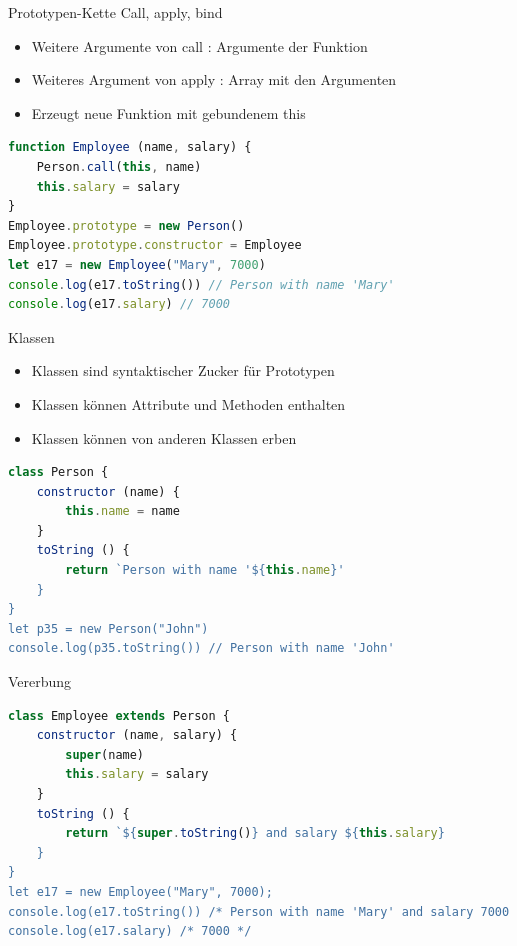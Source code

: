 \begin{concept}{Prototypen-Kette}
    Call, apply, bind
    \begin{itemize}
        \item Weitere Argumente von call : Argumente der Funktion
        \item Weiteres Argument von apply : Array mit den Argumenten
        \item Erzeugt neue Funktion mit gebundenem this
    \end{itemize}
\begin{lstlisting}[language=JavaScript, style=basesmol]
function Employee (name, salary) {
    Person.call(this, name)
    this.salary = salary
}
Employee.prototype = new Person()
Employee.prototype.constructor = Employee
let e17 = new Employee("Mary", 7000)
console.log(e17.toString()) // Person with name 'Mary' 
console.log(e17.salary) // 7000 
\end{lstlisting}
\end{concept}

\begin{definition}{Klassen}
    \begin{itemize}
        \item Klassen sind syntaktischer Zucker für Prototypen
        \item Klassen können Attribute und Methoden enthalten
        \item Klassen können von anderen Klassen erben
    \end{itemize}
\begin{lstlisting}[language=JavaScript, style=basesmol]
class Person {
    constructor (name) {
        this.name = name
    }
    toString () {
        return `Person with name '${this.name}'
    }
}
let p35 = new Person("John")
console.log(p35.toString()) // Person with name 'John'
\end{lstlisting}
\end{definition}

\begin{code}{Vererbung}
\begin{lstlisting}[language=JavaScript, style=basesmol]
class Employee extends Person {
    constructor (name, salary) {
        super(name)
        this.salary = salary
    }
    toString () {
        return `${super.toString()} and salary ${this.salary}
    }
}
let e17 = new Employee("Mary", 7000);
console.log(e17.toString()) /* Person with name 'Mary' and salary 7000 */
console.log(e17.salary) /* 7000 */
\end{lstlisting}
\end{code}

